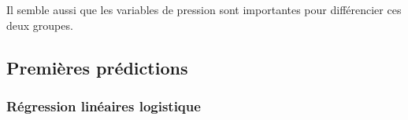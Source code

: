 \documentclass{article}
\begin{document}
Il semble aussi que les variables de pression sont importantes pour différencier ces deux groupes. 

\subsection{Premières prédictions}

\subsubsection{Régression linéaires logistique}

\newpage
\printbibliography
\end{document}

